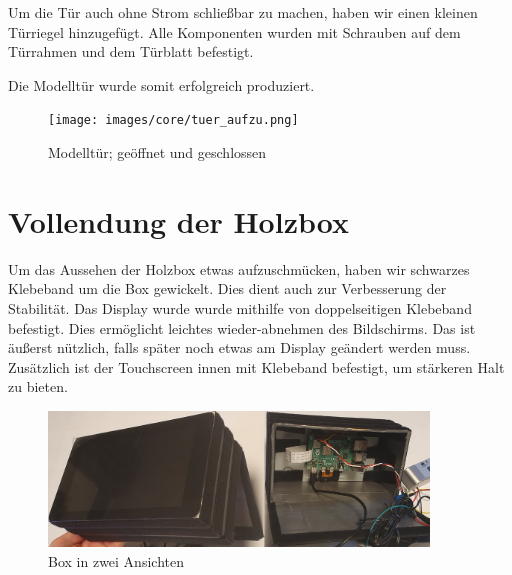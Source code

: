 Um die Tür auch ohne Strom schließbar zu machen, haben wir einen kleinen Türriegel hinzugefügt. Alle Komponenten wurden mit
Schrauben auf dem Türrahmen und dem Türblatt befestigt.

Die Modelltür wurde somit erfolgreich produziert.
\begin{figure}[H]
    \begin{center}
        \texttt{[image: images/core/tuer\_aufzu.png]}
        \caption{Modelltür; geöffnet und geschlossen}
    \end{center}
\end{figure}

\section{Vollendung der Holzbox}
Um das Aussehen der Holzbox etwas aufzuschmücken, haben wir schwarzes Klebeband um die Box gewickelt. Dies dient auch zur Verbesserung der
Stabilität. Das Display wurde wurde mithilfe von doppelseitigen Klebeband befestigt. Dies ermöglicht leichtes wieder-abnehmen des Bildschirms.
Das ist äußerst nützlich, falls später noch etwas am Display geändert werden muss. Zusätzlich ist der Touchscreen innen mit Klebeband befestigt,
um stärkeren Halt zu bieten.


\begin{figure}[H]
    \begin{center}
        \includegraphics[width=0.9\textwidth]{images/core/box_45innen.jpg}
        \caption{Box in zwei Ansichten}
    \end{center}
\end{figure}
